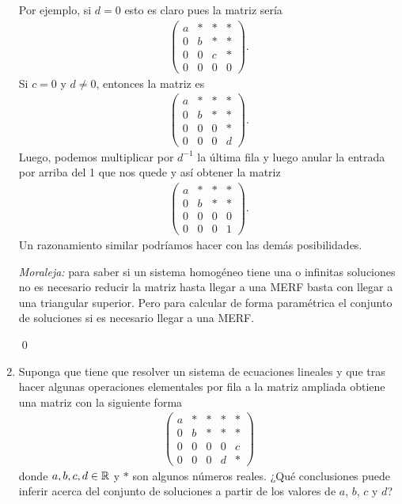 \begin{enumerate}[topsep=6pt, itemsep=.4cm]
Por ejemplo, si $d=0$ esto es claro pues la matriz sería
\begin{align*}
\left(
\begin{array}{cccc}
a & * & * & *\\
0 & b & * & *\\
0 & 0 & c & *\\
0 & 0 & 0 & 0
\end{array}
\right).
\end{align*}
Si $c=0$ y $d\neq0$, entonces la matriz es 
\begin{align*}
\left(
\begin{array}{cccc}
a & * & * & *\\
0 & b & * & *\\
0 & 0 & 0 & *\\
0 & 0 & 0 & d
\end{array}
\right).
\end{align*}
Luego, podemos multiplicar por $d^{-1}$ la última fila y luego anular la entrada por arriba del 1 que nos quede y así obtener la matriz
\begin{align*}
\left(
\begin{array}{cccc}
a & * & * & *\\
0 & b & * & *\\
0 & 0 & 0 & 0\\
0 & 0 & 0 & 1
\end{array}
\right).
\end{align*}
Un razonamiento similar podríamos hacer con las demás posibilidades.

\textit{Moraleja:} para saber si un sistema homogéneo tiene una o infinitas soluciones no es necesario reducir la matriz hasta llegar a una MERF basta con llegar a una triangular superior. Pero para calcular de forma paramétrica el conjunto de soluciones si es necesario llegar a una MERF.

\qed

\item Suponga que tiene que resolver un sistema de ecuaciones lineales y que tras hacer algunas operaciones elementales por fila a la matriz ampliada obtiene una matriz con la siguiente forma
\begin{align*}
\left(
\begin{array}{cccc|c}
a & * & * & * & *\\
0 & b & * & * & *\\
0 & 0 & 0 & 0 & c\\
0 & 0 & 0 & d & *
\end{array}
\right)
\end{align*}
donde $a,b,c,d\in\mathbb R$ y $*$ son algunos números reales.
¿Qué conclusiones puede inferir acerca del conjunto de soluciones a partir de los valores de $a$, $b$, $c$ y $d$?
\rta


\end{enumerate}
